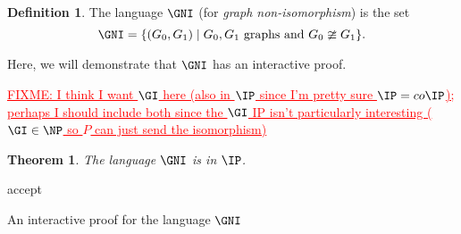 \documentclass[english,12pt]{reedthesis}
\theoremstyle{plain}
\newtheorem{thm}{Theorem}[section]
\theoremstyle{definition}
\newtheorem{defn}[defn]{Definition}
\theoremstyle{remark}
\DeclarePairedDelimiter{\abs}{\lvert}{\rvert}
\newcommand{\FIXME}[1]{\textcolor{red}{\ul{FIXME: #1}}}
\begin{document}
\begin{defn}\label{def:gni}
  The language $\GNI$ (for \emph{graph non-isomorphism}) is the set
  \[
    \GNI = \{(G_{0}, G_{1}) \mid G_{0}, G_{1} \text{ graphs and } G_{0} \ncong G_{1}\}.
  \]
\end{defn}

Here, we will demonstrate that $\GNI$ has an interactive proof.

\FIXME{I think I want $\GI$ here (also in $\IP$ since I'm pretty sure
  $\IP = co\IP$); perhaps I should include both since the $\GI$ IP isn't
  particularly interesting ($\GI \in \NP$ so $P$ can just send the isomorphism)}
\begin{thm}\label{thm:gni-ip}
  The language $\GNI$ is in $\IP$.
\end{thm}

\begin{algorithm}[htbp]
  accept\;
  \caption{An interactive proof for the language $\GNI$}\label{alg:gni-ip}
\end{algorithm}
\end{document}
